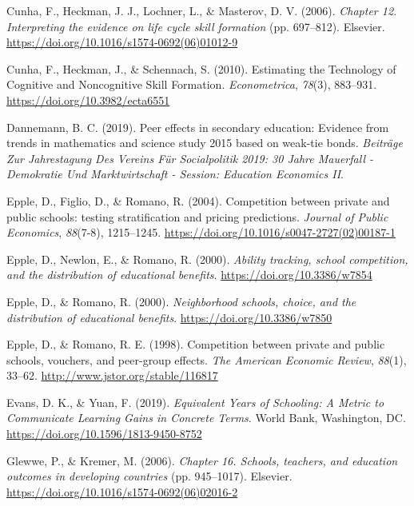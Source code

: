 \documentclass[
]{article}
\newlength{\cslhangindent}
\newenvironment{CSLReferences}[2] %
 {\begin{list}{}{%
  \setlength{\itemindent}{0pt}
  \setlength{\leftmargin}{0pt}
  \setlength{\parsep}{0pt}
  \ifodd #1
   \setlength{\leftmargin}{\cslhangindent}
   \setlength{\itemindent}{-1\cslhangindent}
  \fi
  \setlength{\itemsep}{#2\baselineskip}}}
 {\end{list}}
\begin{document}
\begin{CSLReferences}{1}{0}
Cunha, F., Heckman, J. J., Lochner, L., \& Masterov, D. V. (2006).
\emph{Chapter 12. Interpreting the evidence on life cycle skill
formation} (pp. 697--812). Elsevier.
\url{https://doi.org/10.1016/s1574-0692(06)01012-9}

Cunha, F., Heckman, J., \& Schennach, S. (2010). Estimating the
Technology of Cognitive and Noncognitive Skill Formation.
\emph{Econometrica}, \emph{78}(3), 883--931.
\url{https://doi.org/10.3982/ecta6551}

Dannemann, B. C. (2019). Peer effects in secondary education: Evidence
from trends in mathematics and science study 2015 based on weak-tie
bonds. \emph{Beiträge Zur Jahrestagung Des Vereins Für Socialpolitik
2019: 30 Jahre Mauerfall - Demokratie Und Marktwirtschaft - Session:
Education Economics II}.

Epple, D., Figlio, D., \& Romano, R. (2004). Competition between private
and public schools: testing stratification and pricing predictions.
\emph{Journal of Public Economics}, \emph{88}(7-8), 1215--1245.
\url{https://doi.org/10.1016/s0047-2727(02)00187-1}

Epple, D., Newlon, E., \& Romano, R. (2000). \emph{Ability tracking,
school competition, and the distribution of educational benefits}.
\url{https://doi.org/10.3386/w7854}

Epple, D., \& Romano, R. (2000). \emph{Neighborhood schools, choice, and
the distribution of educational benefits}.
\url{https://doi.org/10.3386/w7850}

Epple, D., \& Romano, R. E. (1998). Competition between private and
public schools, vouchers, and peer-group effects. \emph{The American
Economic Review}, \emph{88}(1), 33--62.
\url{http://www.jstor.org/stable/116817}

Evans, D. K., \& Yuan, F. (2019). \emph{Equivalent Years of Schooling: A
Metric to Communicate Learning Gains in Concrete Terms}. World Bank,
Washington, DC. \url{https://doi.org/10.1596/1813-9450-8752}

Glewwe, P., \& Kremer, M. (2006). \emph{Chapter 16. Schools, teachers,
and education outcomes in developing countries} (pp. 945--1017).
Elsevier. \url{https://doi.org/10.1016/s1574-0692(06)02016-2}


\end{CSLReferences}
\end{document}
